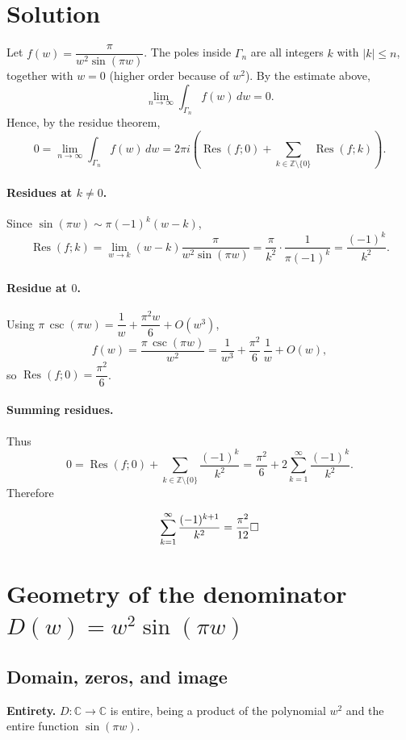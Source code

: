 \documentclass[12pt,a4paper]{article}
\newcommand{\C}{\mathbb{C}}
\begin{document}
\section*{Solution}
Let $f(w)=\dfrac{\pi}{w^{2}\sin(\pi w)}$. The poles inside $\Gamma_n$ are all integers $k$ with $|k|\le n$, together with $w=0$ (higher order because of $w^{2}$). By the estimate above,
\[
\lim_{n\to\infty}\int_{\Gamma_n} f(w)\,dw=0.
\]
Hence, by the residue theorem,
\[
0=\lim_{n\to\infty}\int_{\Gamma_n} f(w)\,dw
=2\pi i\left(\operatorname{Res}(f;0)+\sum_{k\in\mathbb Z\setminus\{0\}}\operatorname{Res}(f;k)\right).
\]

\paragraph{Residues at $k\neq0$.}
Since $\sin(\pi w)\sim \pi(-1)^k(w-k)$,
\[
\operatorname{Res}(f;k)
=\lim_{w\to k}(w-k)\frac{\pi}{w^{2}\sin(\pi w)}
=\frac{\pi}{k^{2}}\cdot\frac{1}{\pi(-1)^k}
=\frac{(-1)^k}{k^{2}}.
\]

\paragraph{Residue at $0$.}
Using $\pi\,\csc(\pi w)=\dfrac1{w}+\dfrac{\pi^{2}w}{6}+O(w^{3})$,
\[
f(w)=\frac{\pi\,\csc(\pi w)}{w^{2}}
=\frac{1}{w^{3}}+\frac{\pi^{2}}{6}\,\frac{1}{w}+O(w),
\]
so $\operatorname{Res}(f;0)=\dfrac{\pi^{2}}{6}$.

\paragraph{Summing residues.}
Thus
\[
0=\operatorname{Res}(f;0)+\sum_{k\in\mathbb Z\setminus\{0\}}\frac{(-1)^k}{k^{2}}
=\frac{\pi^{2}}{6}+2\sum_{k=1}^{\infty}\frac{(-1)^k}{k^{2}}.
\]
Therefore

\[
\sum_{k=1}^\infty \frac{(-1)^{k+1}}{k^2}=\frac{\pi^2}{12} \hfill\square
\]


\section*{Geometry of the denominator \(D(w)=w^{2}\sin(\pi w)\)}

\subsection*{Domain, zeros, and image}

\textbf{Entirety.} \(D:\C\to\C\) is entire, being a product of the polynomial \(w^{2}\) and the entire function \(\sin(\pi w)\).
\end{document}
